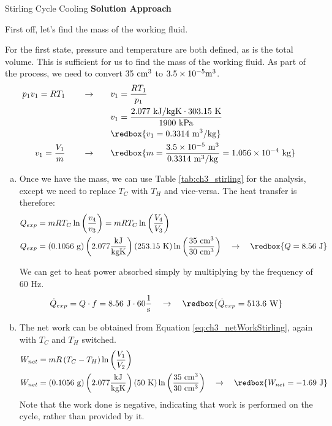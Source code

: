 \begin{example}[label={ex:StirlingCooling}]{Stirling Cycle Cooling}
{\bf Solution Approach}

First off, let's find the mass of the working fluid.

For the first state, pressure and temperature are both defined, as is the total volume.  This is sufficient for us to find the mass of the working fluid.  As part of the process, we need to convert 35 $\rm cm^3$ to $3.5\times 10^{-5} \rm m^3$.
\begin{align*}
  p_1v_1=RT_1 \quad\quad \rightarrow & \quad\quad v_1 = \frac{RT_1}{p_1} \\
  & \quad\quad v_1 = \frac{2.077 {\rm\ kJ/kgK} \cdot 303.15{\rm\ K}}{1900\ \rm kPa} \\
  & \quad\quad \redbox{v_1 = 0.3314 \rm\ m^3/kg} \\
  v_1 = \frac{V_1}{m} \quad\quad \rightarrow & \quad\quad \redbox{m = \frac{3.5\times 10^{-5} \rm\ m^3}{0.3314\ \rm m^3/kg} = 1.056\times 10^{-4}\ \rm kg}
\end{align*}

\begin{enumerate}[a)]
\item Once we have the mass, we can use Table \ref{tab:ch3_stirling} for the analysis, except we need to replace $T_C$ with $T_H$ and vice-versa. The heat transfer is therefore:
  \begin{align*}
    Q_{exp} &= m R T_C \ln{\left(\frac{v_4}{v_3}\right)} = m R T_C \ln{\left(\frac{V_4}{V_3}\right)} \\
    Q_{exp} &= ({0.1056\ \rm g}) \left(2.077\frac{\rm kJ}{\rm kg K}\right) (253.15\ {\rm K}) \ln{\left(\frac{35\ \rm cm^3}{30\ \rm cm^3}\right)} \quad\rightarrow\quad \redbox{Q = 8.56\ \rm J}
  \end{align*}

  We can get to heat power absorbed simply by multiplying by the frequency of 60 Hz.
  \begin{equation*}
    \dot{Q}_{exp} = Q \cdot f = {8.56\ \rm J} \cdot 60 \frac{1}{\rm s} \quad\rightarrow\quad \redbox{\dot{Q}_{exp} = 513.6\rm\ W}
  \end{equation*}

\item The net work can be obtained from Equation \ref{eq:ch3_netWorkStirling}, again with $T_C$ and $T_H$ switched.
  \begin{align*}
    W_{net} &= m R \left(T_C-T_H\right) \ln{\left(\frac{V_1}{V_2}\right)} \\
    W_{net} &= ({0.1056\ \rm g}) \left(2.077\frac{\rm kJ}{\rm kg K}\right) (50\ {\rm K}) \ln{\left(\frac{35\ \rm cm^3}{30\ \rm cm^3}\right)} \quad\rightarrow\quad \redbox{W_{net} = -1.69\ \rm J}
  \end{align*}
  Note that the work done is negative, indicating that work is performed on the cycle, rather than provided by it.


\end{enumerate}
\end{example}
